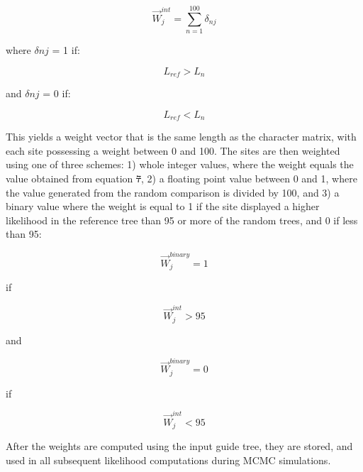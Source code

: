 \documentclass[12pt]{article}
\providecommand{\DIFadd}[1]{{\protect\color{blue}\uwave{#1}}} %
\providecommand{\DIFdel}[1]{{\protect\color{red}\sout{#1}}}                      %
\providecommand{\DIFaddbegin}{} %
\providecommand{\DIFaddend}{} %
\providecommand{\DIFdelbegin}{} %
\providecommand{\DIFdelend}{} %
\newcommand{\DIFscaledelfig}{0.5}
\newlength{\DIFdelgraphicswidth} %
\newlength{\DIFdelgraphicsheight} %
\newcommand{\DIFaddincludegraphics}[2][]{{\color{blue}\fbox{\DIFOincludegraphics[#1]{#2}}}} %
\newcommand{\DIFdelincludegraphics}[2][]{%
\sbox{\DIFdelgraphicsbox}{\DIFOincludegraphics[#1]{#2}}%
\settoboxwidth{\DIFdelgraphicswidth}{\DIFdelgraphicsbox} %
\settoboxtotalheight{\DIFdelgraphicsheight}{\DIFdelgraphicsbox} %
\scalebox{\DIFscaledelfig}{%
\parbox[b]{\DIFdelgraphicswidth}{\usebox{\DIFdelgraphicsbox}\\[-\baselineskip] \rule{\DIFdelgraphicswidth}{0em}}\llap{\resizebox{\DIFdelgraphicswidth}{\DIFdelgraphicsheight}{%
\setlength{\unitlength}{\DIFdelgraphicswidth}%
\begin{picture}(1,1)%
\thicklines\linethickness{2pt} %
{\color[rgb]{1,0,0}\put(0,0){\framebox(1,1){}}}%
{\color[rgb]{1,0,0}\put(0,0){\line( 1,1){1}}}%
{\color[rgb]{1,0,0}\put(0,1){\line(1,-1){1}}}%
\end{picture}%
}\hspace*{3pt}}} %
} %
\DeclareRobustCommand{\DIFaddbegin}{\DIFOaddbegin \let\includegraphics\DIFaddincludegraphics} %
\DeclareRobustCommand{\DIFaddend}{\DIFOaddend \let\includegraphics\DIFOincludegraphics} %
\DeclareRobustCommand{\DIFdelbegin}{\DIFOdelbegin \let\includegraphics\DIFdelincludegraphics} %
\DeclareRobustCommand{\DIFdelend}{\DIFOaddend \let\includegraphics\DIFOincludegraphics} %
\begin{document}
\begin{equation}
\overrightarrow{W}^{int}_j = \sum\limits_{n=1}^{100}\delta_{nj}
\end{equation}

where $\delta nj$ = 1 if:

\begin{equation}
L_{ref} > L_n 
\end{equation}

and $\delta nj$ = 0 if:

\begin{equation}
L_{ref} < L_n 
\end{equation}

This yields a weight vector that is the same length as the character
matrix, with each site possessing a weight between 0 and 100. The sites
are then weighted using one of three schemes: 1) whole integer values,
where the weight equals the value obtained from equation \DIFdelbegin \DIFdel{7}\DIFdelend \DIFaddbegin \DIFadd{11}\DIFaddend , 2) a
floating point value between 0 and 1, where the value generated from the
random comparison is divided by 100, and 3) a binary value where the
weight is equal to 1 if the site displayed a higher likelihood in the
reference tree than 95 or more of the random trees, and 0 if less than
95:

\begin{equation}
\overrightarrow{W}^{binary}_j = 1
\end{equation}

if 

\begin{equation}
\overrightarrow{W}^{int}_j > 95 
\end{equation}

and

\begin{equation}
\overrightarrow{W}^{binary}_j = 0
\end{equation}

if

\begin{equation}
\overrightarrow{W}^{int}_j <  95
\end{equation}

After the weights are computed using the input guide tree, they are stored, and used in all subsequent likelihood computations during MCMC simulations.
\end{document}
